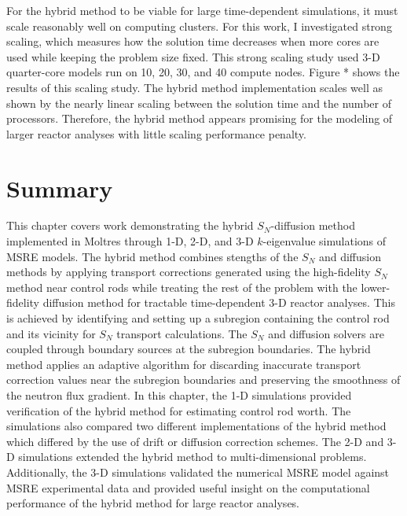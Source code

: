 For the hybrid method to be viable for large time-dependent simulations, it must scale reasonably
well on computing clusters. For this work, I investigated strong scaling, which measures how the
solution time decreases when more cores are used while keeping the problem size fixed. This strong
scaling study used 3-D quarter-core models run on 10, 20, 30, and 40 compute nodes.
Figure * shows the results of this scaling study.
The hybrid method implementation scales well as shown by the nearly linear scaling between the
solution time and the number of processors. Therefore, the hybrid method appears promising for the
modeling of larger reactor analyses with little scaling performance penalty.


\section{Summary}

This chapter covers work demonstrating the hybrid $S_N$-diffusion method implemented in Moltres
through 1-D, 2-D, and 3-D $k$-eigenvalue simulations of \gls{MSRE} models. The hybrid method
combines stengths of the $S_N$
and diffusion methods by applying transport corrections generated using the high-fidelity $S_N$
method near control rods while treating the rest of the problem with the lower-fidelity diffusion
method for tractable time-dependent 3-D reactor analyses. This is achieved by identifying and
setting up a subregion containing the control rod and its vicinity for $S_N$ transport
calculations. The $S_N$ and diffusion solvers are coupled through boundary sources at the subregion
boundaries. The hybrid method applies an adaptive algorithm for discarding inaccurate transport
correction values near the subregion boundaries and preserving the smoothness of the neutron flux
gradient. In this chapter, the 1-D simulations provided verification of the hybrid method for
estimating control rod worth. The simulations also compared two different implementations of the
hybrid method which differed by the use of drift or diffusion correction schemes.
The 2-D and 3-D simulations extended the hybrid method to multi-dimensional problems. Additionally,
the 3-D simulations validated the numerical \gls{MSRE} model against \gls{MSRE} experimental data
and provided useful insight on the computational performance of the hybrid method for
large reactor analyses.

